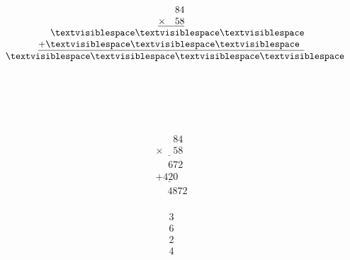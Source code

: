 \begin{minipage}[t]{0.3\linewidth}
\begin{align*}\begin{array}{c}
\phantom{
\times00
}
84\\
\underline{
\times
\phantom{
00
}
58
}\\
\phantom{
+0
}
\textvisiblespace
\textvisiblespace
\textvisiblespace
\\
\underline{
+
\textvisiblespace
\textvisiblespace
\textvisiblespace
\phantom0
}
\\
\phantom{+}
\textvisiblespace
\textvisiblespace
\textvisiblespace
\textvisiblespace
\end{array}\end{align*}
\end{minipage}
\begin{minipage}[t]{0.05\linewidth}
\begin{align*}\begin{array}{c}
\textvisiblespace
\\
\textvisiblespace
\\
\textvisiblespace
\\
\textvisiblespace
\end{array}\end{align*}
\end{minipage}
\begin{minipage}[t]{0.3\linewidth}
\begin{align*}\begin{array}{c}
\phantom{
\times00
}
84\\
\underline{
\times
\phantom{
00
}
58
}\\
\phantom{
+0
}
672
\\
\underline{
+
420
\phantom0
}
\\
\phantom{+}
4872
\end{array}\end{align*}
\end{minipage}
\begin{minipage}[t]{0.05\linewidth}
\begin{align*}\begin{array}{c}
3
\\
6
\\
2
\\
4
\end{array}\end{align*}
\end{minipage}

